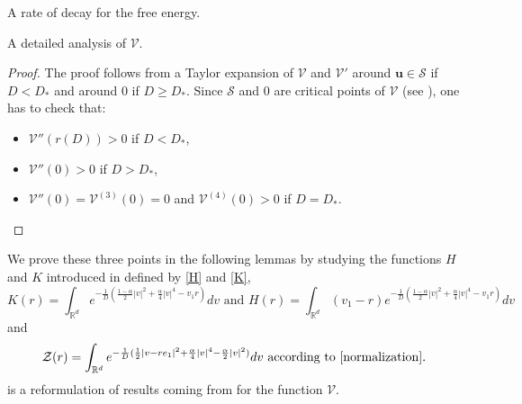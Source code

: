 \documentclass[reqno]{amsart} %
\begin{document}
\begin{section}{A rate of decay for the free energy.}
\begin{subsection}{A detailed analysis of  \texorpdfstring{$\mathcal{V}$}{V}.}
 
\begin{proof}
    The proof follows from a Taylor expansion of $\mathcal{V}$ and $\mathcal{V}'$ around $\mathbf{u}\in \mathcal{S}$ if $D<D_*$ and around $0$ if $D\geq D_*$. Since $\mathcal{S}$ and $0$ are critical points of $\mathcal{V}$ (see ), one has to check that:
    \begin{itemize}
        \item $\mathcal{V}''(r(D))>0$ if $D<D_*$,
        \item $\mathcal{V}''(0)>0 $ if $D>D_*$,
        \item $\mathcal{V}''(0)=\mathcal{V}^{(3)}(0)=0$ and $\mathcal{V}^{(4)}(0)>0$ if $D=D_*$. \qedhere
    \end{itemize}
\end{proof}
We prove these three points in the following lemmas by studying the functions $H$ and $K$ introduced in  \cite{Li2021} defined by \eqref{H} and \eqref{K},
\[K(r)= \int_{\mathbb{R}^d}{e^{-\frac{1}{D}\left(\frac{1-\alpha}{2}|v|^2+ \frac{\alpha}{4} |v|^4-v_1r\right)}}dv \text{ and } H(r)= \int_{\mathbb{R}^d}{(v_1-r)e^{-\frac{1}{D}\left(\frac{1-\alpha}{2}|v|^2+ \frac{\alpha}{4} |v|^4-v_1r\right)}}dv\]
and 
 \[\mathcal{Z}(r)= \int_{\mathbb{R}^d}{e^{-\frac{1}{D}(\frac{1}{2}|v-re_1|^2+ \frac{\alpha}{4} |v|^4 -\frac{\alpha}{2}|v|^2)}dv} \text{ according to } \eqref{normalization}.\]
  is a reformulation of results coming from \cite{Li2021} for the function $\mathcal{V}$.


\end{subsection}
\end{section}
\end{document}
